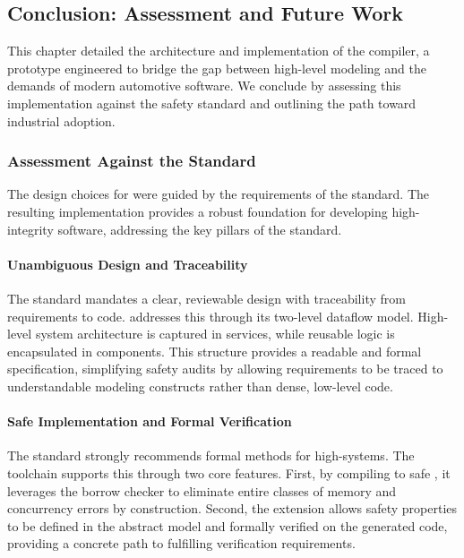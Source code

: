 \subsection{Conclusion: \iso Assessment and Future Work}
\label{sec:grust:implem:assessment_and_future}

This chapter detailed the architecture and implementation of the \GRust compiler, a prototype
engineered to bridge the gap between high-level modeling and the demands of modern automotive
software. We conclude by assessing this implementation against the \iso safety standard and
outlining the path toward industrial adoption.

\subsubsection{Assessment Against the \iso Standard}

The design choices for \GRust were guided by the requirements of the \iso standard. The resulting
implementation provides a robust foundation for developing high-integrity software, addressing the
key pillars of the standard.

\paragraph{Unambiguous Design and Traceability}
The standard mandates a clear, reviewable design with traceability from requirements to code. \GRust
addresses this through its two-level dataflow model. High-level system architecture is captured in
\GRFRP services, while reusable logic is encapsulated in \GRSync components. This structure provides
a readable and formal specification, simplifying safety audits by allowing requirements to be traced
to understandable modeling constructs rather than dense, low-level code.

\paragraph{Safe Implementation and Formal Verification}
The standard strongly recommends formal methods for high-\Asil systems. The \GRust toolchain
supports this through two core features. First, by compiling to safe \Rust, it leverages the borrow
checker to eliminate entire classes of memory and concurrency errors by construction. Second, the
\GReusot extension allows safety properties to be defined in the abstract \GRust model and formally
verified on the generated \Rust code, providing a concrete path to fulfilling verification
requirements.

